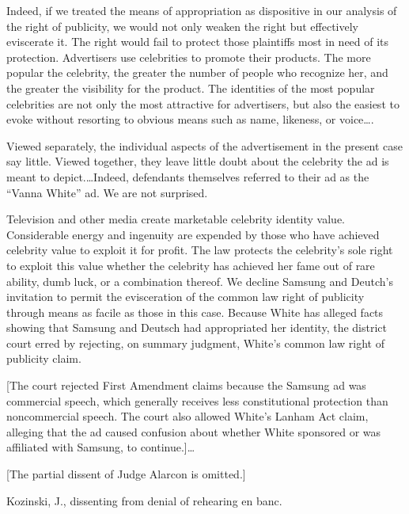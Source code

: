 Indeed, if we treated the means of appropriation as dispositive in our analysis
of the right of publicity, we would not only weaken the right but effectively
eviscerate it. The right would fail to protect those plaintiffs most in need of
its protection. Advertisers use celebrities to promote their products. The more
popular the celebrity, the greater the number of people who recognize her, and
the greater the visibility for the product. The identities of the most popular
celebrities are not only the most attractive for advertisers, but also the
easiest to evoke without resorting to obvious means such as name, likeness, or
voice\dots.

Viewed separately, the individual aspects of the advertisement in the present
case say little. Viewed together, they leave little doubt about the celebrity
the ad is meant to depict.\dots Indeed, defendants themselves referred to
their ad as the ``Vanna White'' ad. We are not surprised.

Television and other media create marketable celebrity identity value.
Considerable energy and ingenuity are expended by those who have achieved
celebrity value to exploit it for profit. The law protects the celebrity's sole
right to exploit this value whether the celebrity has achieved her fame out of
rare ability, dumb luck, or a combination thereof. We decline Samsung and
Deutch's invitation to permit the evisceration of the common law right of
publicity through means as facile as those in this case. Because White has
alleged facts showing that Samsung and Deutsch had appropriated her identity,
the district court erred by rejecting, on summary judgment, White's common law
right of publicity claim.

[The court rejected First Amendment claims because the Samsung ad was commercial
speech, which generally receives less constitutional protection than
noncommercial speech.  The court also allowed White's Lanham Act claim,
alleging that the ad caused confusion about whether White sponsored or was
affiliated with Samsung, to continue.]\dots

[The partial dissent of Judge Alarcon is omitted.]


\opinion Kozinski, J., dissenting from denial of rehearing en banc.

